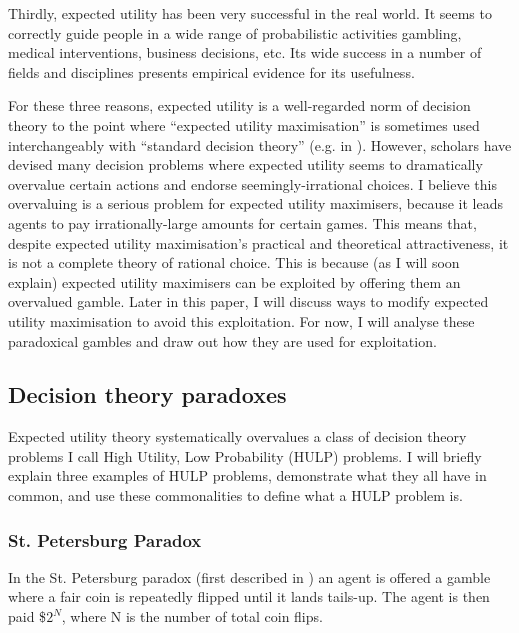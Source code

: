 \documentclass{article}
\begin{document}
Thirdly, expected utility has been very successful in the real world. It seems to correctly guide people in a wide range of probabilistic activities \textemdash{} gambling, medical interventions, business decisions, etc. Its wide success in a number of fields and disciplines presents empirical evidence for its usefulness.

For these three reasons, expected utility is a well-regarded norm of decision theory \textemdash{} to the point where ``expected utility maximisation'' is sometimes used interchangeably with ``standard decision theory'' (e.g. in \citep[pg. 38]{colyvan2008relative}). However, scholars have devised many decision problems where expected utility seems to dramatically overvalue certain actions and endorse seemingly-irrational choices. I believe this overvaluing is a serious problem for expected utility maximisers, because it leads agents to pay irrationally-large amounts for certain games. This means that, despite expected utility maximisation's practical and theoretical attractiveness, it is not a complete theory of rational choice. This is because (as I will soon explain) expected utility maximisers can be exploited by offering them an overvalued gamble. Later in this paper, I will discuss ways to modify expected utility maximisation to avoid this exploitation. For now, I will analyse these paradoxical gambles and draw out how they are used for exploitation.

\subsection {Decision theory paradoxes}

Expected utility theory systematically overvalues a class of decision theory problems I call High Utility, Low Probability (HULP) problems. I will briefly explain three examples of HULP problems, demonstrate what they all have in common, and use these commonalities to define what a HULP problem is.

\subsubsection {St. Petersburg Paradox}

In the St. Petersburg paradox (first described in \citep{bernoulli1954exposition}) an agent is offered a gamble where a fair coin is repeatedly flipped until it lands tails-up. The agent is then paid \$\(2^N\), where N is the number of total coin flips.
\end{document}
